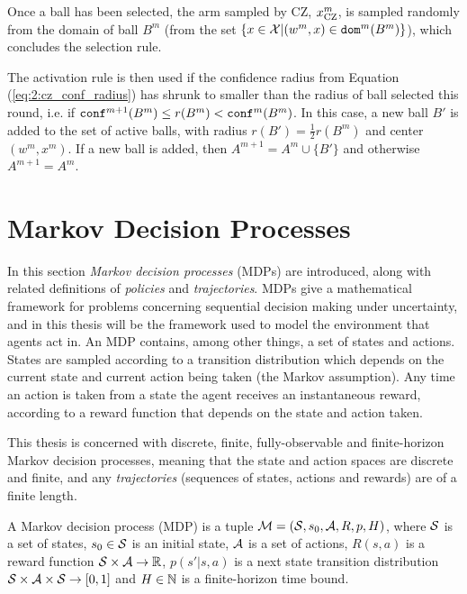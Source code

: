         Once a ball has been selected, the arm sampled by CZ, $x^m_{{\textnormal{CZ}}}$, is sampled randomly from the domain of ball $B^m$ (from the set $\{x\in\mathcal{X}|(w^m,x)\in{\textnormal{\texttt{dom}}}^m(B^m)\}$), which concludes the selection rule.

        The activation rule is then used if the confidence radius from Equation (\ref{eq:2:cz_conf_radius}) has shrunk to smaller than the radius of ball selected this round, i.e. if ${\textnormal{\texttt{conf}}}^{m+1}(B^m) \leq r(B^m) < {\textnormal{\texttt{conf}}}^m(B^m)$. In this case, a new ball $B'$ is added to the set of active balls, with radius $r(B')=\frac{1}{2}r(B^m)$ and center $(w^m,x^m)$. If a new ball is added, then $A^{m+1}=A^m\cup \{B'\}$ and otherwise $A^{m+1}=A^m$.













    


\section{Markov Decision Processes}
\label{sec:2-2-mdps}

    In this section \textit{Markov decision processes} (MDPs) are introduced, along with related definitions of \textit{policies} and \textit{trajectories}. MDPs give a mathematical framework for problems concerning sequential decision making under uncertainty, and in this thesis will be the framework used to model the environment that agents act in. An MDP contains, among other things, a set of states and actions. States are sampled according to a transition distribution which depends on the current state and current action being taken (the Markov assumption). Any time an action is taken from a state the agent receives an instantaneous reward, according to a reward function that depends on the state and action taken.

    This thesis is concerned with discrete, finite, fully-observable and finite-horizon Markov decision processes, meaning that the state and action spaces are discrete and finite, and any \textit{trajectories} (sequences of states, actions and rewards) are of a finite length. 

    \begin{defn}
        \label{def:2:mdp}
        A \textnormal{Markov decision process} (MDP) is a tuple $\mathcal{M}=(\mathcal{S},s_0,\mathcal{A},R,p,H)$, where $\mathcal{S}$ is a set of states, $s_0\in\mathcal{S}$ is an initial state, $\mathcal{A}$ is a set of actions, $R(s,a)$ is a reward function $\mathcal{S}\times \mathcal{A}\rightarrow \mathbb{R}$, $p(s' | s,a)$ is a next state transition distribution $\mathcal{S} \times \mathcal{A} \times \mathcal{S} \rightarrow [0,1]$ and $H\in\mathbb{N}$ is a finite-horizon time bound.
    \end{defn}

